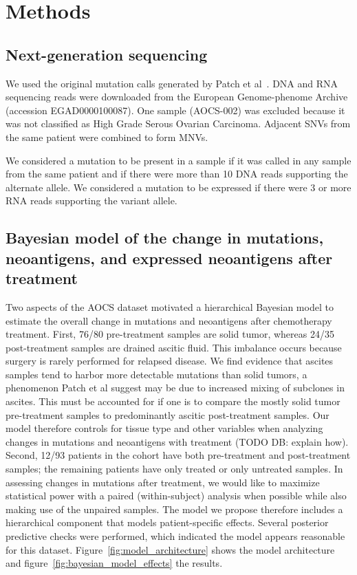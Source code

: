\section*{Methods}

\subsection*{Next-generation sequencing}
We used the original mutation calls generated by Patch et al~\cite{Patch_2015}. DNA and RNA sequencing reads were downloaded from the European Genome-phenome Archive (accession EGAD0000100087). One sample (AOCS-002) was excluded because it was not classified as High Grade Serous Ovarian Carcinoma. Adjacent SNVs from the same patient were combined to form MNVs.

We considered a mutation to be present in a sample if it was called in any sample from the same patient and if there were more than 10 DNA reads supporting the alternate allele. We considered a mutation to be expressed if there were 3 or more RNA reads supporting the variant allele.

\subsection*{Bayesian model of the change in mutations, neoantigens, and expressed neoantigens after treatment}
Two aspects of the AOCS dataset motivated a hierarchical Bayesian model to estimate the overall change in mutations and neoantigens after chemotherapy treatment. First, 76/80 pre-treatment samples are solid tumor, whereas 24/35 post-treatment samples are drained ascitic fluid. This imbalance occurs because surgery is rarely performed for relapsed disease. We find evidence that ascites samples tend to harbor more detectable mutations than solid tumors, a phenomenon Patch et al suggest may be due to increased mixing of subclones in ascites. This must be accounted for if one is to compare the mostly solid tumor pre-treatment samples to predominantly ascitic post-treatment samples. Our model therefore controls for tissue type and other variables when analyzing changes in mutations and neoantigens with treatment (TODO DB: explain how). Second, 12/93 patients in the cohort have both pre-treatment and post-treatment samples; the remaining patients have only treated or only untreated samples. In assessing changes in mutations after treatment, we would like to maximize statistical power with a paired (within-subject) analysis when possible while also making use of the unpaired samples. The model we propose therefore includes a hierarchical component that models patient-specific effects. Several posterior predictive checks were performed, which indicated the model appears reasonable for this dataset. Figure~\ref{fig:model_architecture} shows the model architecture and figure~\ref{fig:bayesian_model_effects} the results. 

